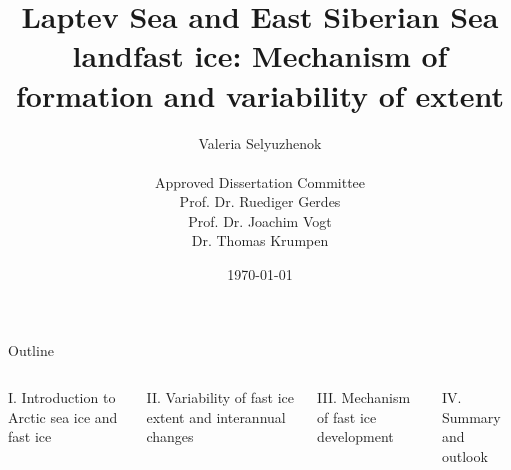 \documentclass[8pt]{beamer}
\title{Laptev Sea and East Siberian Sea landfast ice: Mechanism of formation and variability of extent}
\date{\today}
\author{Valeria Selyuzhenok\\~\\\textsf {Approved Dissertation Committee}\\
	\textsf{Prof. Dr. Ruediger Gerdes}\\ 
	\textsf{Prof. Dr. Joachim Vogt}\\ 	
	\textsf{Dr. Thomas Krumpen}\\ }
\institute{Jacobs University Bremen}
\begin{document}
\maketitle

	
\setwatermark{\fontsize{125pt}{125pt}\selectfont{}}
\begin{frame}{Outline}
	\begin{columns}
		\begin{block}{I. Introduction to Arctic sea ice and fast ice}
		\end{block}
		\begin{block}{II. Variability of fast ice extent and interannual changes}
		\end{block}
		\begin{block}{III. Mechanism of fast ice development}
		\end{block}
		\begin{block}{IV. Summary and outlook} 
		\end{block}
	\end{columns}
\end{frame}
\end{document}
